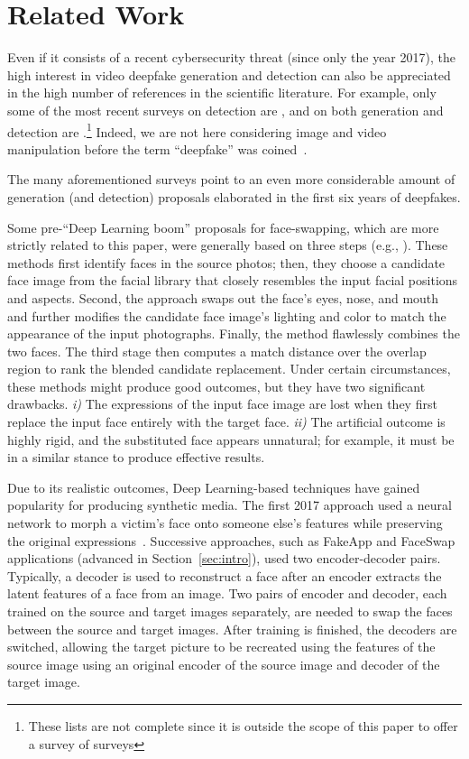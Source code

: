 \documentclass[preprint]{elsarticle}
\begin{document}
\section{Related Work}\label{sect:related}
Even if it consists of a recent cybersecurity threat (since only the year 2017), the high interest in video deepfake generation and detection can also be appreciated in the high number of references in the scientific literature. For example, only some of the most recent surveys on detection are \cite{surveydet,detection1,surveydet2}, and on both generation and detection are \cite{survey2,surveydgen1,survey3,survey4,survey1}.\footnote{These lists are not complete since it is outside the scope of this paper to offer a survey of surveys} Indeed, we are not here considering image and video manipulation before the term ``deepfake'' was coined~\cite{farid,bookvideoprocessing}.

The many aforementioned surveys point to an even more considerable amount of generation (and detection) proposals elaborated in the first  six years of deepfakes.

Some  pre-``Deep Learning boom'' proposals for face-swapping, which are more strictly related to this paper, were generally based on three steps (e.g., \cite{beforeDL}). These methods first identify faces in the source photos; then, they choose a candidate face image from the facial library that closely resembles the input facial positions and aspects. Second, the approach swaps out the face's eyes, nose, and mouth and further modifies the candidate face image's lighting and color to match the appearance of the input photographs. Finally, the method flawlessly combines the two faces. The third stage then computes a match distance over the overlap region to rank the blended candidate replacement. Under certain circumstances, these methods might produce good outcomes, but they have two significant drawbacks. \emph{i)} The expressions of the input face image are lost when they first replace the input face entirely with the target face. \emph{ii)} The artificial outcome is highly rigid, and the substituted face appears unnatural; for example, it must be in a similar stance to produce effective results.

Due to its realistic outcomes, Deep Learning-based techniques have gained popularity for producing synthetic media. The first 2017 approach used  a neural network to morph a victim’s face onto someone else’s features while preserving the original  expressions~\cite{survey2}. Successive approaches, such as FakeApp and FaceSwap applications (advanced in Section~\ref{sec:intro}),  used two encoder-decoder pairs. Typically, a decoder is used to reconstruct a face after an encoder extracts the latent features of a face from an image. Two pairs of encoder and decoder, each trained on the source and target images separately, are needed to swap the faces between the source and target images. After training is finished, the decoders are switched, allowing the target picture to be recreated using the features of the source image using an original encoder of the source image and decoder of the target image.
\end{document}

